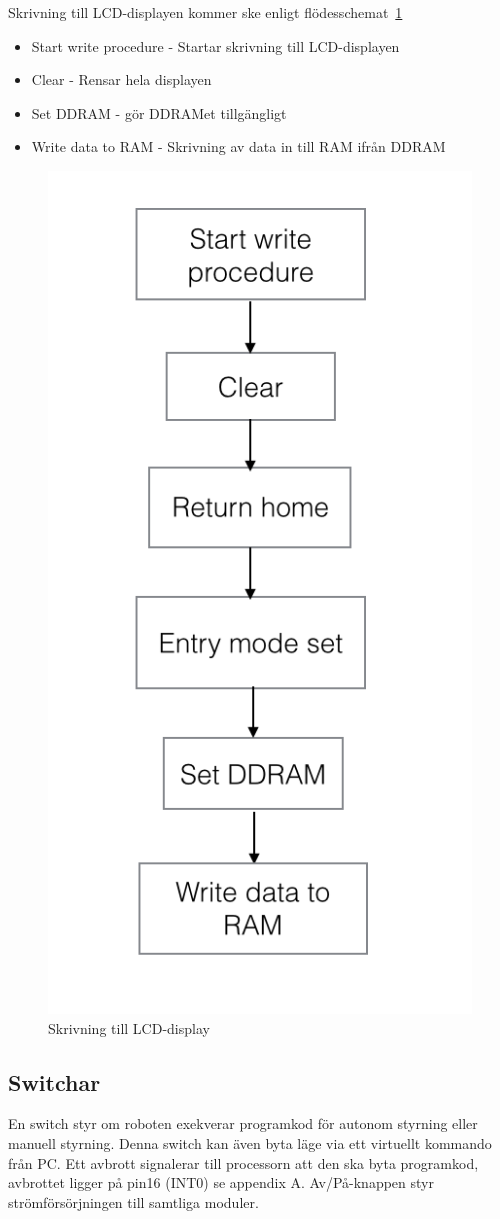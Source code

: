 \documentclass[a4paper,12pt,fleqn]{article}
\begin{document}
Skrivning till LCD-displayen kommer ske enligt flödesschemat~\ref{fig:flowlcdwrite}
\begin{itemize}
  \item Start write procedure - Startar skrivning till LCD-displayen
  \item Clear - Rensar hela displayen
  \item Set DDRAM - gör DDRAMet tillgängligt
  \item Write data to RAM - Skrivning av data in till RAM ifrån DDRAM
\end{itemize}

\begin{figure}[htp] %
  \begin{center}
  \includegraphics[keepaspectratio=true,width=0.5\linewidth]{bilder/write}  %
  \end{center}
  \caption{Skrivning till LCD-display} %
  \label{fig:flowlcdwrite}
\end{figure}


\subsection{Switchar}
En switch styr om roboten exekverar programkod för autonom styrning eller manuell styrning. Denna switch kan även byta läge via ett virtuellt kommando från PC. Ett avbrott signalerar till processorn att den ska byta programkod, avbrottet ligger på pin16 (INT0) se appendix A. Av/På-knappen styr strömförsörjningen till samtliga moduler. 
\end{document}
